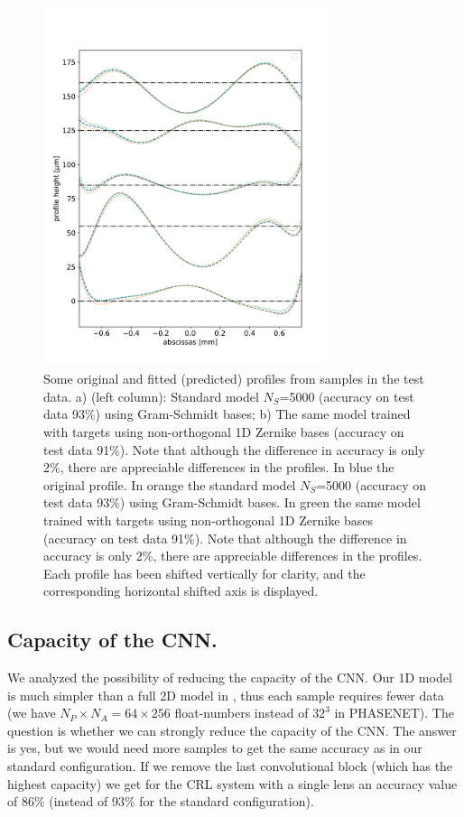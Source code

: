 \documentclass[preprint]{iucr}
\newcommand{\inred}[1]{{\color{red}#1}}
\begin{document}
\begin{figure}\label{fig:v14profiles}
    \includegraphics[width=0.75\textwidth]{figures/figure4.pdf}
    \caption{Some original and fitted (predicted) profiles from samples in the test data.
    a) (left column): Standard model $N_S$=5000 (accuracy on test  data 93\%) using Gram-Schmidt bases;
    b) The same model trained with targets using  non-orthogonal 1D Zernike bases (accuracy on test  data 91\%). Note that although the difference in accuracy is only 2\%, there are appreciable differences in the profiles.
    \inred{In blue the original profile. In orange the standard model $N_S$=5000 (accuracy on test  data 93\%) using Gram-Schmidt bases. In green the same model trained with targets using  non-orthogonal 1D Zernike bases (accuracy on test  data 91\%). Note that although the difference in accuracy is only 2\%, there are appreciable differences in the profiles. Each profile has been shifted vertically for clarity, and the corresponding horizontal shifted axis is displayed.
    }
    }
\end{figure}

\subsection{Capacity of the CNN.}
We analyzed the possibility of reducing the capacity of the CNN. Our 1D model is much simpler than a full 2D model in \cite{Saha2020}, thus each sample requires fewer data (we have $N_P\times N_A=64\times 256$ float-numbers instead of $32^3$ in PHASENET). The question is whether we can strongly reduce the capacity of the CNN. The answer is yes, but we would need more samples to get the same accuracy as in our standard configuration. If we remove the last convolutional block (which has the highest capacity) we get for the CRL system with a single lens an accuracy value of 86\% (instead of 93\% for the standard configuration).
\end{document}
